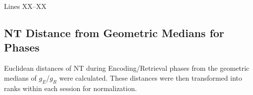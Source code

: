 {
  \color{revision_color}
  \revEditor{}
  Lines XX--XX\\
  \subsection{NT Distance from Geometric Medians for Phases}
  Euclidean distances of NT during Encoding/Retrieval phases from the geometric medians of $g_{E}$/$g_{R}$ were calculated. These distances were then transformed into ranks within each session for normalization.
}
